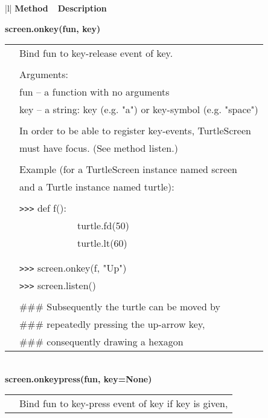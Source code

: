 \begin{center}
{\small
\begin{tabular}{|l|} \hline
{\bf Method~~Description}  \\ \hline\hline 



{\bf    screen.onkey(fun, key)} \\
   \begin{tabular}{p{0.25in}p{4in}}
&        Bind fun to key-release event of key. \\
&  \\
&        Arguments: \\
&        fun -- a function with no arguments \\
&        key -- a string: key (e.g. "a") or key-symbol (e.g. "space") \\
&  \\
&        In order to be able to register key-events, TurtleScreen \\
&        must have focus. (See method listen.) \\
&  \\
&        Example (for a TurtleScreen instance named screen \\
&        and a Turtle instance named turtle): \\
&  \\
&        \verb+>+\verb+>+\verb+>+ def f(): \\
&                ~~~~~~~~~~~~turtle.fd(50) \\
&                ~~~~~~~~~~~~turtle.lt(60) \\
&  \\
&  \\
&        \verb+>+\verb+>+\verb+>+ screen.onkey(f, "Up") \\
&        \verb+>+\verb+>+\verb+>+ screen.listen() \\
&  \\
&        \#\#\# Subsequently the turtle can be moved by \\
&        \#\#\# repeatedly pressing the up-arrow key, \\
&        \#\#\# consequently drawing a hexagon \\
\end{tabular} \\ \hline
{\bf    screen.onkeypress(fun, key=None)} \\
   \begin{tabular}{p{0.25in}p{4in}}
&        Bind fun to key-press event of key if key is given, \\

\end{tabular}
\end{tabular}}
\end{center}
